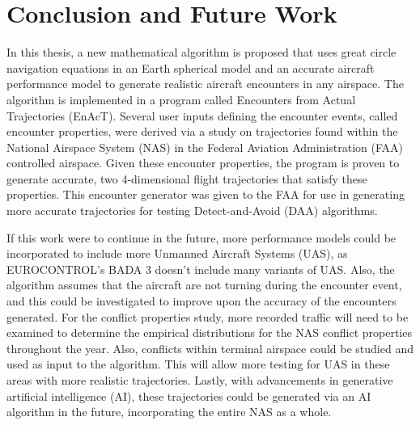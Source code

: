 \chapter{Conclusion and Future Work}
In this thesis, a new mathematical algorithm is proposed that uses great circle navigation equations in an Earth spherical model and an accurate aircraft performance model to generate realistic aircraft encounters in any airspace. The algorithm is implemented in a program called Encounters from Actual Trajectories (EnAcT). Several user inputs defining the encounter events, called encounter properties, were derived via a study on trajectories found within the National Airspace System (NAS) in the Federal Aviation Administration (FAA) controlled airspace. Given these encounter properties, the program is proven to generate accurate, two 4-dimensional flight trajectories that satisfy these properties. This encounter generator was given to the FAA for use in generating more accurate trajectories for testing Detect-and-Avoid (DAA) algorithms.

If this work were to continue in the future, more performance models could be incorporated to include more Unmanned Aircraft Systems (UAS), as EUROCONTROL’s BADA 3 doesn’t include many variants of UAS. Also, the algorithm assumes that the aircraft are not turning during the encounter event, and this could be investigated to improve upon the accuracy of the encounters generated. For the conflict properties study, more recorded traffic will need to be examined to determine the empirical distributions for the NAS conflict properties throughout the year. Also, conflicts within terminal airspace could be studied and used as input to the algorithm. This will allow more testing for UAS in these areas with more realistic trajectories. Lastly, with advancements in generative artificial intelligence (AI), these trajectories could be generated via an AI algorithm in the future, incorporating the entire NAS as a whole.	